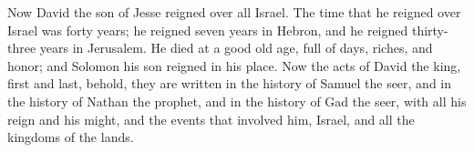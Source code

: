 \myverse{}Now David the son of Jesse reigned over all Israel.
\myverse{}The time that he reigned over Israel was forty years; he reigned seven years
in Hebron, and he reigned thirty-three years in Jerusalem.
\myverse{}He died at a good old age, full of days, riches, and honor; and Solomon his
son reigned in his place.
\myverse{}Now the acts of David the king, first and last, behold, they are written
in the history of Samuel the seer, and in the history of Nathan the prophet, and in the history of Gad
the seer,
\myverse{}with all his reign and his might, and the events that involved him, Israel,
and all the kingdoms of the lands.


